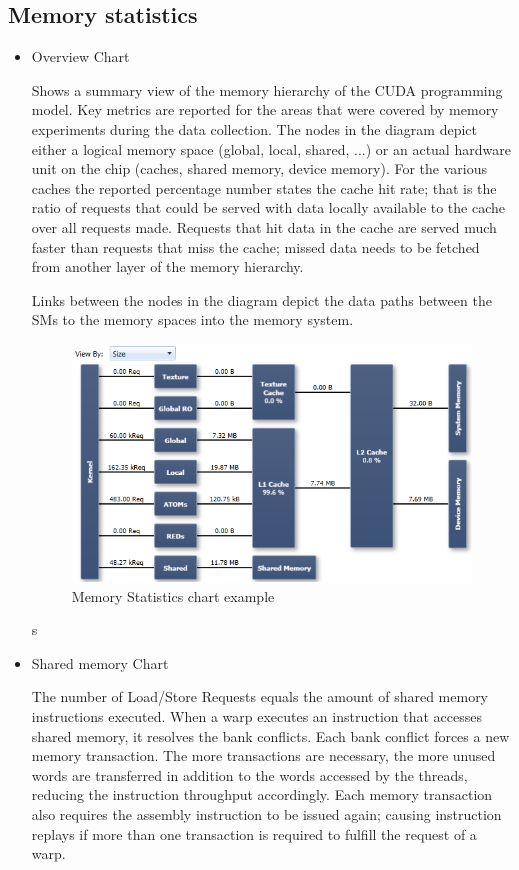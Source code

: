 \documentclass[oneside,openright,12pt,final,en]{mgr}
\begin{document}
\subsection{Memory statistics}

\begin{itemize}
	\item Overview Chart
	
	Shows a summary view of the memory hierarchy of the CUDA programming model. Key metrics are reported for the areas that were covered by memory experiments during the data collection. The nodes in the diagram depict either a logical memory space (global, local, shared, ...) or an actual hardware unit on the chip (caches, shared memory, device memory). For the various caches the reported percentage number states the cache hit rate; that is the ratio of requests that could be served with data locally available to the cache over all requests made. Requests that hit data in the cache are served much faster than requests that miss the cache; missed data needs to be fetched from another layer of the memory hierarchy.
	
	Links between the nodes in the diagram depict the data paths between the SMs to the memory spaces into the memory system.
	
	\begin{figure}[H]
		\centering
		\includegraphics{MemoryStatisticsChart}
		\caption{Memory Statistics chart example}
	\end{figure}
s
	\item Shared memory Chart
	
	The number of Load/Store Requests equals the amount of shared memory instructions executed. When a warp executes an instruction that accesses shared memory, it resolves the bank conflicts. Each bank conflict forces a new memory transaction. The more transactions are necessary, the more unused words are transferred in addition to the words accessed by the threads, reducing the instruction throughput accordingly. Each memory transaction also requires the assembly instruction to be issued again; causing instruction replays if more than one transaction is required to fulfill the request of a warp.
	

\end{itemize}
\end{document}
